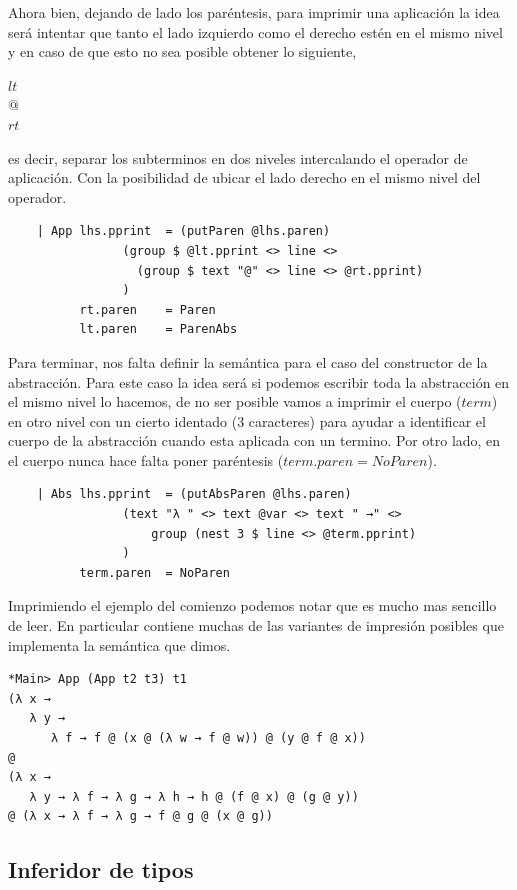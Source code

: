 \documentclass[a4paper,10pt]{article}
\begin{document}
Ahora bien, dejando de lado los paréntesis, para imprimir una aplicación la idea será
intentar que tanto el lado izquierdo como el derecho estén en el mismo nivel y en caso
de que esto no sea posible obtener lo siguiente,

\begin{center}
$lt$\\
$@$\\
$rt$
\end{center}

es decir, separar los subterminos en dos niveles intercalando el operador de aplicación.
Con la posibilidad de ubicar el lado derecho en el mismo nivel del operador.

\begin{lstlisting}    
    | App lhs.pprint  = (putParen @lhs.paren) 
                (group $ @lt.pprint <> line <> 
                  (group $ text "@" <> line <> @rt.pprint)
                )
          rt.paren    = Paren
          lt.paren    = ParenAbs
\end{lstlisting}    

Para terminar, nos falta definir la semántica para el caso del constructor de la
abstracción. Para este caso la idea será si podemos escribir toda la abstracción
en el mismo nivel lo hacemos, de no ser posible vamos a imprimir el cuerpo ($term$)
en otro nivel con un cierto identado (3 caracteres) para ayudar a identificar el
cuerpo de la abstracción cuando esta aplicada con un termino. Por otro lado, en el
cuerpo nunca hace falta poner paréntesis ($term.paren = NoParen$).

\begin{lstlisting}
    | Abs lhs.pprint  = (putAbsParen @lhs.paren)
                (text "λ " <> text @var <> text " →" <> 
                    group (nest 3 $ line <> @term.pprint)
                )
          term.paren  = NoParen
\end{lstlisting}

Imprimiendo el ejemplo del comienzo podemos notar que es mucho mas sencillo de
leer. En particular contiene muchas de las variantes de impresión posibles que
implementa la semántica que dimos.

\begin{verbatim}
*Main> App (App t2 t3) t1
(λ x →
   λ y →
      λ f → f @ (x @ (λ w → f @ w)) @ (y @ f @ x))
@
(λ x →
   λ y → λ f → λ g → λ h → h @ (f @ x) @ (g @ y))
@ (λ x → λ f → λ g → f @ g @ (x @ g))
\end{verbatim}

\subsection{Inferidor de tipos}
 
\end{document}
